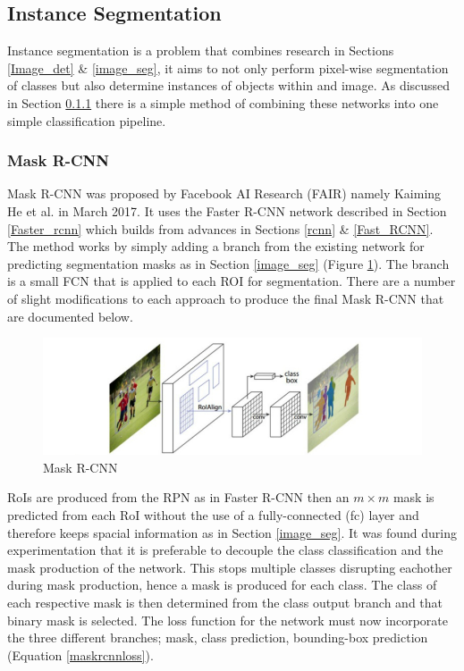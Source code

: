 \documentclass[a4paper,11pt,notitlepage]{article}
\begin{document}
\subsection{Instance Segmentation}
Instance segmentation is a problem that combines research in Sections \ref{Image_det} \& \ref{image_seg}, it aims to not only perform pixel-wise segmentation of classes but also determine instances of objects within and image. As discussed in Section \ref{mask_rcnn} there is a simple method of combining these networks into one simple classification pipeline.
\subsubsection{Mask R-CNN} \label{mask_rcnn}
Mask R-CNN was proposed by Facebook AI Research (FAIR) namely Kaiming He et al. in March 2017. It uses the Faster R-CNN network described in Section \ref{Faster_rcnn} which builds from advances in Sections \ref{rcnn}  \& \ref{Fast_RCNN}. The method works by simply adding a branch from the existing network for predicting segmentation masks as in Section \ref{image_seg} (Figure \ref{Mask_rcnn_arch}). The branch is a small FCN that is applied to each ROI for segmentation. There are a number of slight modifications to each approach to produce the final Mask R-CNN that are documented below.
\newline \newline

\noindent \begin{figure}[h!]
\includegraphics[width = 1.0\hsize]{./figures/mask_arch.jpg}
\caption{Mask R-CNN \cite{DBLP:journals/corr/HeGDG17}}
\label{Mask_rcnn_arch}
\end{figure}
RoIs are produced from the RPN as in Faster R-CNN \cite{DBLP:journals/corr/RenHG015} then an $m \times m$ mask is predicted from each RoI without the use of a fully-connected (fc) layer and therefore keeps spacial information as in Section \ref{image_seg}. It was found during experimentation that it is preferable to decouple the class classification and the mask production of the network. This stops multiple classes disrupting eachother during mask production, hence a mask is produced for each class. The class of each respective mask is then determined from the class output branch and that binary mask is selected. 
\newline \newline
The loss function for the network must now incorporate the three different branches; mask, class prediction, bounding-box prediction (Equation \ref{maskrcnnloss}). 
\end{document}
